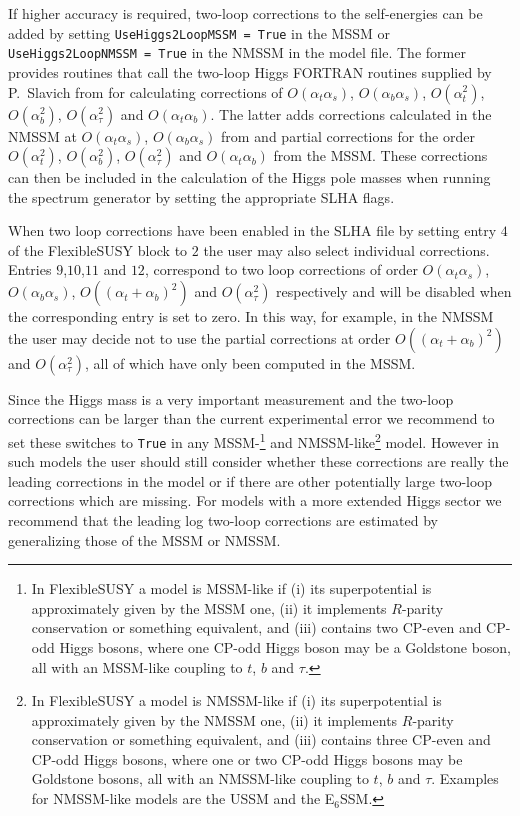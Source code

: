\documentclass[final,3p,11pt,pdflatex]{elsarticle}
\makeatletter
\newcommand{\fs}{FlexibleSUSY\@\xspace}
\newcommand{\ESSM}{E$_6$SSM\@\xspace}
\newcommand{\code}[1]{\lstinline|#1|}  %
\def\at{\alpha_t}
\def\ab{\alpha_b}
\def\as{\alpha_s}
\def\atau{\alpha_{\tau}}
\def\oatab{O(\at\ab)}
\def\oatas{O(\at\as)}
\def\oabas{O(\ab\as)}
\def\oatq{O(\at^2)}
\def\oabq{O(\ab^2)}
\def\oatauq{O(\atau^2)}
\def\oatplusabsq{O((\at+\ab)^2)}
\makeatother
\begin{document}
If higher accuracy is required, two-loop corrections to the
self-energies can be added by setting \code{UseHiggs2LoopMSSM = True}
in the MSSM or \code{UseHiggs2LoopNMSSM = True} in the NMSSM in the
model file.  The former provides routines that call the two-loop Higgs
FORTRAN routines supplied by P.~Slavich from
\cite{Degrassi:2001yf,Brignole:2001jy,Dedes:2002dy,Brignole:2002bz,Dedes:2003km}
for calculating corrections of $\oatas$, $\oabas$, $\oatq$, $\oabq$,
$\oatauq$ and $\oatab$.  The latter adds corrections calculated in the
NMSSM at $\oatas$, $\oabas$ from \cite{Degrassi:2009yq} and partial
corrections for the order $\oatq$, $\oabq$, $\oatauq$ and $\oatab$ from the
MSSM.  These corrections can then be included in the
calculation of the Higgs pole masses when running the spectrum
generator by setting the appropriate SLHA flags.  

  When two loop corrections have been enabled in the SLHA
  file by setting entry $4$ of the FlexibleSUSY block to $2$ the user may
  also select individual corrections. Entries $9$,$10$,$11$ and $12$,
  correspond to two loop corrections of order $\oatas$, $\oabas$,
  $\oatplusabsq$ and $\oatauq$ respectively and will be disabled when
  the corresponding entry is set to zero. In this way, for example, in
  the NMSSM the user may decide not to use the partial corrections at
  order $\oatplusabsq$ and $\oatauq$, all of which have
  only been computed in the MSSM. 

Since the Higgs mass is a very important measurement and the two-loop
corrections can be larger than the current experimental error
\cite{Degrassi:2009yq} we recommend to set these switches to
\code{True} in any MSSM-\footnote{In \fs a model is MSSM-like if (i)
  its superpotential is approximately given by the MSSM one, (ii) it
  implements $R$-parity conservation or something equivalent, and
  (iii) contains two CP-even and CP-odd Higgs bosons, where one CP-odd
  Higgs boson may be a Goldstone boson, all with an MSSM-like coupling
  to $t$, $b$ and $\tau$.} and NMSSM-like\footnote{In \fs a model is
  NMSSM-like if (i) its superpotential is approximately given by the
  NMSSM one, (ii) it implements $R$-parity conservation or something
  equivalent, and (iii) contains three CP-even and CP-odd Higgs
  bosons, where one or two CP-odd Higgs bosons may be Goldstone
  bosons, all with an NMSSM-like coupling to $t$, $b$ and $\tau$\@.
  Examples for NMSSM-like models are the USSM and the \ESSM.} model.
However in such models the user should still consider whether these
corrections are really the leading corrections in the model or if
there are other potentially large two-loop corrections which are
missing.  For models with a more extended Higgs sector we recommend
that the leading log two-loop corrections are estimated by
generalizing those of the MSSM or NMSSM.
\end{document}
